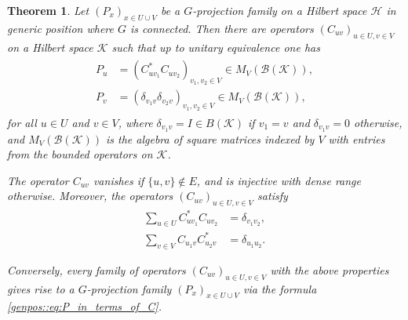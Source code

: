 \documentclass[a4paper]{amsart}
\newtheorem{thm}{Theorem}[section]
\begin{document}
\begin{thm} 
    \label{genpos::thm:projections_in_generic_position}
    Let $(P_x)_{x \in U \cup V}$ be a $G$-projection family on a Hilbert space $\mathcal{H}$ in generic position where $G$ is connected. Then there are operators $(C_{uv})_{u \in U, v \in V}$ on a Hilbert space $\mathcal{K}$ such that up to unitary equivalence one has
    \begin{align}
        \begin{aligned}
        P_u &= (C_{u v_1}^\ast C_{u v_2})_{v_1, v_2 \in V} \in M_{V}(\mathcal{B}(\mathcal{K})), \\
        P_v &= (\delta_{v_1 v} \delta_{v_2 v})_{v_1, v_2 \in V} \in M_{V}(\mathcal{B}(\mathcal{K})), 
        \end{aligned} \label{genpos::eq:P_in_terms_of_C}
    \end{align}
    for all $u \in U$ and $v \in V$, where $\delta_{v_1 v} = I \in B(\mathcal{K})$ if $v_1 = v$ and $\delta_{v_1 v} = 0$ otherwise, and $M_{V}(\mathcal{B}(\mathcal{K}))$ is the algebra of square matrices indexed by $V$ with entries from the bounded operators on $\mathcal{K}$.
    
    The operator $C_{uv}$ vanishes if $\{u, v\} \not \in E$, and is injective with dense range otherwise. Moreover, the operators $(C_{uv})_{u \in U, v \in V}$ satisfy
    \begin{align}
        \sum_{u \in U} C_{u v_1}^\ast C_{u v_2} &= \delta_{v_1 v_2}, \label{bga:generic_position:G-contraction_family_condition_1} \\
        \sum_{v \in V} C_{u_1 v} C_{u_2 v}^\ast &= \delta_{u_1 u_2}. \label{bga:generic_position:G-contraction_family_condition_2}
    \end{align}

    Conversely, every family of operators $(C_{uv})_{u \in U, v \in V}$ with the above properties gives rise to a $G$-projection family $(P_x)_{x \in U \cup V}$ via the formula \eqref{genpos::eq:P_in_terms_of_C}.
\end{thm}
\end{document}
